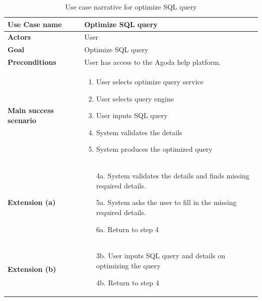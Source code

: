     \begin{table}[H]
        \centering
        \caption{Use case narrative for optimize SQL query}
        \label{tbl:use-case-optimize-sql}
        \begin{tabular}{|p{4cm}|p{10cm}|}
        \hline
        \textbf{Use Case name} & Optimize SQL query \\ \hline
        \textbf{Actors} & User \\ \hline
        \textbf{Goal} & Optimize SQL query \\ \hline
        \textbf{Preconditions} & User has access to the Agoda help platform. \\ \hline
        \textbf{Main success scenario} & 
        \begin{enumerate}
            \item User selects optimize query service
            \item User selects query engine
            \item User inputs SQL query
            \item System validates the details
            \item System produces the optimized query
        \end{enumerate}
        \\ \hline
        \textbf{Extension (a)} & 
        \begin{enumerate}
            \item[4a.] System validates the details and finds missing required details.
            \item[5a.] System asks the user to fill in the missing required details.
            \item[6a.] Return to step 4
        \end{enumerate}
        \\ \hline
        \textbf{Extension (b)} & 
        \begin{enumerate}
            \item[3b.] User inputs SQL query and details on optimizing the query
            \item[4b.] Return to step 4
        \end{enumerate}
        \\ \hline
        \end{tabular}
    \end{table}
